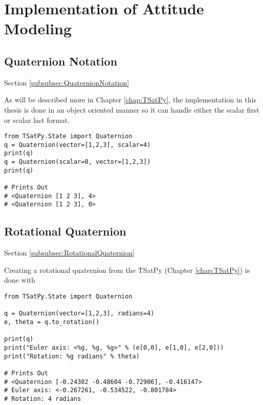\section{Implementation of Attitude Modeling}
\label{sec:ImplementationofAttitudeModeling}


\subsection{Quaternion Notation}
\label{subsec:Implementation-QuaternionNotation}
Section \ref{subsubsec:QuaternionNotation}

As will be described more in Chapter \ref{chap:TSatPy}, the implementation in this thesis is done in an object oriented manner so it can handle either the scalar first or scalar last format.

\begin{singlespace}
  \begin{verbatim}
from TSatPy.State import Quaternion
q = Quaternion(vector=[1,2,3], scalar=4)
print(q)
q = Quaternion(scalar=0, vector=[1,2,3])
print(q)

# Prints Out
# <Quaternion [1 2 3], 4>
# <Quaternion [1 2 3], 0>
  \end{verbatim}
  \nocite{minted}
\end{singlespace}

\subsection{Rotational Quaternion}
\label{subsec:Implementation-RotationalQuaternion}
Section \ref{subsubsec:RotationalQuaternion}

Creating a rotational quaternion from the TSatPy (Chapter \ref{chap:TSatPy}) is done with

\begin{singlespace}
  \begin{verbatim}
from TSatPy.State import Quaternion

q = Quaternion(vector=[1,2,3], radians=4)
e, theta = q.to_rotation()

print(q)
print("Euler axis: <%g, %g, %g>" % (e[0,0], e[1,0], e[2,0]))
print("Rotation: %g radians" % theta)

# Prints Out
# <Quaternion [-0.24302 -0.48604 -0.72906], -0.416147>
# Euler axis: <-0.267261, -0.534522, -0.801784>
# Rotation: 4 radians
  \end{verbatim}
  \nocite{minted}
\end{singlespace}

